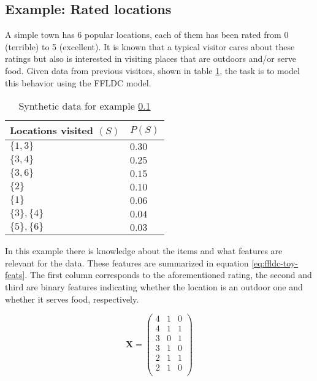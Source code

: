 \subsection{Example: Rated locations}
\label{sec:ffldc-toy}

A simple town has 6 popular locations, each of them has been rated from 0 (terrible) to 5 (excellent). It is known that a typical visitor cares about these ratings but also is interested in visiting places that are outdoors and/or serve food. Given data from previous visitors, shown in table \ref{tab:ffldc-toy-probs}, the task is to model this behavior using the FFLDC model.

\begin{table}
  \centering
  \caption{Synthetic data for example \ref{sec:ffldc-toy}}
  \begin{tabular}{@{}ll@{}}
    \toprule
    Locations visited $(S)$ & $P(S)$  \\
    \midrule
    $\{1,3\}$ & $0.30$ \\
    $\{3,4\}$ & $0.25$ \\
    $\{3,6\}$ & $0.15$ \\
    $\{2\}$ & $0.10$ \\
    $\{1\}$ & $0.06$ \\
    $\{3\}, \{4\}$ & $0.04$ \\
    $\{5\}, \{6\}$ & $0.03$ \\
    \bottomrule
  \end{tabular}
  \label{tab:ffldc-toy-probs}
\end{table}

In this example there is knowledge about the items and what features are relevant for the data. These features are summarized in equation \ref{eq:ffldc-toy-feats}. The first column corresponds to the aforementioned rating, the second and third are binary features indicating whether the location is an outdoor one and whether it serves food, respectively.

\begin{equation}
  \mathbf{X} = \left(
    \begin{array}{ccc}
      4 & 1 & 0 \\
      4 & 1 & 1 \\
      3 & 0 & 1 \\
      3 & 1 & 0 \\
      2 & 1 & 1 \\
      2 & 1 & 0  \\
     \end{array}
  \right)
  \label{eq:ffldc-toy-feats}
\end{equation}

